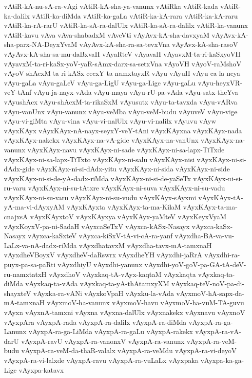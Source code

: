 {vAtiR-kA-nu-sA-ra-vAgi
vAtiR-kA-sha-ya-vanunx
vAtiRka
vAtiR-kada
vAtiR-ka-dalilx
vAtiR-ka-diMda
vAtiR-ka-gaLa
vAtiR-ka-kA-rara
vAtiR-ka-kA-raru
vAtiR-ka-rA-rarU
vAtiR-ka-sA-ra-dalUlx
vAtiR-ka-sA-ra-dalilx
vAtiR-ka-vanunx
vAtiR-kavu
vAva
vAva-shabadxM
vAveVti
vAyAvx-kA-sha-davxyaM
vAyAvx-kA-sha-parx-NA-DeyxYvaM
vAyAvx-kA-sha-ra-sa-tevxVna
vAyAvx-kA-sha-rasoV
vAyAvx-kA-sha-sa-mu-daBxvaH
vAyaRteV
vAyavaH
vAyavxM-ta-ri-kaSxyoVH
vAyavxM-ta-ri-kaSx-yoV-yaR-sAmx-darx-sa-setxVna
vAyoVH
vAyoV-raMshoV
vAyoV-shAcxM-ta-ri-kASx-cecxY-ta-namxtayxR
vAyu
vAyuH
vAyu-ca-la-neya
vAyu-gaLa
vAyu-gaLeV
vAyu-ga-LigU
vAyu-ga-Lige
vAyu-gaLu
vAyu-heyxVR-veY-tAnf
vAyu-ja-nayx-vAda
vAyu-maya
vAyu-rU-pa-vAda
vAyu-satx-theYva
vAyushAcx
vAyu-shAcxM-ta-rikaSxM
vAyusutx
vAyu-ta-tavxda
vAyu-vARva
vAyu-vanUnx
vAyu-vanunx
vAyu-veMba
vAyu-veM-budu
vAyuveV
vAyu-vige
vAyu-vi-giMta
vAyu-vina
vAyu-vi-nalUlx
vAyu-vi-nalilx
vAyuvu
vAyw
vAyxKAyx
vAyxKAyx-nA-nayx-seyxY-veY-tAni
vAyxKAyxna
vAyxKAyx-nada
vAyxKAyx-nakekx
vAyxKAyx-na-vA-gide
vAyxKAyx-na-vanUnx
vAyxKAyx-na-vanunx
vAyxKAyx-navu
vAyxKAyx-ni-sade
vAyxKAyx-ni-sa-lapx-TiTxde
vAyxKAyx-ni-sa-lapx-TiTxto
vAyxKAyx-ni-salu
vAyxKAyx-nisi
vAyxKAyx-ni-si-dAdx-gide
vAyxKAyx-ni-si-dAdx-yitu
vAyxKAyx-ni-sida
vAyxKAyx-ni-side
vAyxKAyx-ni-si-de-yA-dadx-riMda
vAyxKAyx-ni-si-de-yaSeTx
vAyxKAyx-ni-si-ru-varu
vAyxKAyx-ni-su-tAtxre
vAyxKAyx-ni-suva
vAyxKAyx-ni-su-vadu
vAyxKAyx-ni-su-varu
vAyxKAyx-ni-su-vudu
vAyxKAyx-sAyxmi
vAyxKAyx-tA-yA-ma-vi-dAyxyAM
vAyxKAyxta
vAyxKAyx-ta-ma-KilaM
vAyxKAyx-ta-ma-cnajxsA
vAyxKAyxtoV
vAyxKAyxya
vAyxKAyx-yaMteV
vAyxKeyxVyaM
vAyxKoyxV-pa-ni-SadaH
vAyxcaSeTxV
vAyxca-kASx-Nasayx
vAyxca-kaSx-Nasayx
vAyxca-kaSxteV
vAyxca-kiSxV-tA-vi-cA-ra-yanf
vAyxdha-BA-va-vu-LaLx-va-nA-dadx-riMda
vAyxdhatavxM
vAyxdha-tavx-mA-tamxnaH
vAyxdheVBoyxV
vAyxdheV-daRswrx
vAyxdheYH
vAyxdhi-jaRrA
vAyxdhi-ra-puyx-pa-sa-paRti
vAyxdhiyU
vAyxdhi-yanunx
vAyxdhi-yoV-goV-pa-GA-tA-deV-ru-namxtatxH
vAyxdhoV
vAyxkaq-tA-vAyx-kaqtaM
vAyxkaqta
vAyxkaq-ta-diMda
vAyxkaq-ta-vAda
vAyxkaq-ta-yA-thAtamxyXM
vAyxkaq-teV-noV-pa-di-shayxteV
vAyxka-ra-vANi
vAyxkoVpaH
vAyxku-la-vAda
vAyxmoV-hA-sapx-da-mA-tamxnaH
vAyxmoV-ha-vanunx
vAyxmoV-havu
vAyxmoV-ha-vuM-TA-guvu
vAyxn
vAyxnA-tamxni
vAyxna
vAyxna-dalUlx
vAyxnakekx
vAyxnavu
vAyxnoV
vAyxpAra
vAyxpA-rada
vAyxpA-ra-dalilx
vAyxpA-ra-diMda
vAyxpA-ra-ga-Lanunx
vAyxpA-ra-ga-LiMda
vAyxpA-ra-gaLu
vAyxpA-rakekx
vAyxpA-ra-vA-darU
vAyxpA-ravU
vAyxpA-ra-vanonxV
vAyxpA-ra-vanunx
vAyxpA-ra-veM-budu
vAyxpA-ra-veM-da-thaR-valalx
vAyxpA-ra-veMdu
vAyxpA-ra-vi-deyoV
vAyxpA-ra-vi-lalxde
vAyxpA-ravu
vAyxpA-ra-vuLaLx
vAyxpaka
vAyxpa-ka-ga-Lige
vAyxpa-katavx
}
